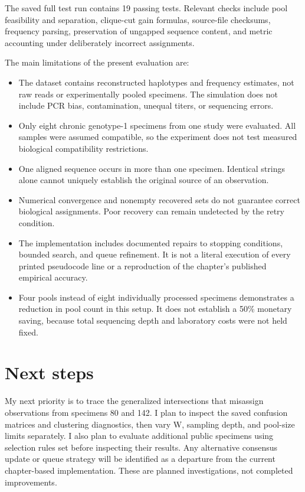The saved full test run contains 19 passing tests. Relevant checks
include pool feasibility and separation, clique-cut gain formulas,
source-file checksums, frequency parsing, preservation of ungapped
sequence content, and metric accounting under deliberately incorrect
assignments.

The main limitations of the present evaluation are:

\begin{itemize}
\tightlist
\item
  The dataset contains reconstructed haplotypes and frequency estimates,
  not raw reads or experimentally pooled specimens. The simulation does
  not include PCR bias, contamination, unequal titers, or sequencing
  errors.
\item
  Only eight chronic genotype-1 specimens from one study were evaluated.
  All samples were assumed compatible, so the experiment does not test
  measured biological compatibility restrictions.
\item
  One aligned sequence occurs in more than one specimen. Identical
  strings alone cannot uniquely establish the original source of an
  observation.
\item
  Numerical convergence and nonempty recovered sets do not guarantee
  correct biological assignments. Poor recovery can remain undetected by
  the retry condition.
\item
  The implementation includes documented repairs to stopping conditions,
  bounded search, and queue refinement. It is not a literal execution of
  every printed pseudocode line or a reproduction of the chapter's
  published empirical accuracy.
\item
  Four pools instead of eight individually processed specimens
  demonstrates a reduction in pool count in this setup. It does not
  establish a 50\% monetary saving, because total sequencing depth and
  laboratory costs were not held fixed.
\end{itemize}

\hypertarget{next-steps}{%
\section{Next steps}\label{next-steps}}

My next priority is to trace the generalized intersections that
misassign observations from specimens 80 and 142. I plan to inspect the
saved confusion matrices and clustering diagnostics, then vary W,
sampling depth, and pool-size limits separately. I also plan to evaluate
additional public specimens using selection rules set before inspecting
their results. Any alternative consensus update or queue strategy will
be identified as a departure from the current chapter-based
implementation. These are planned investigations, not completed
improvements.

